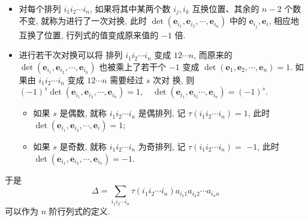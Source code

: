 \documentclass[10pt,punct]{ctexbeamer}
\begin{document}
    \begin{frame}

\begin{itemize}
        \item
      对每个排列 $i_1 i_2 \cdots i_n$, 如果将其中某两个数 $i_j, i_k$ 互换位置、其余的 $n-2$ 个数不变, 就称为进行了一次\alert{对换}, 此时 $\operatorname{det}\left(\boldsymbol{e}_{i_1}, \boldsymbol{e}_{i_2}, \cdots, \boldsymbol{e}_{i_n}\right)$ 中的 $\boldsymbol{e}_{i_j}, \boldsymbol{e}_i$, 相应地互换了位置, 行列式的值变成原来值的 $-1$ 倍.

      \item
      进行若干次对换可以将
      排列 $i_1 i_2 \cdots i_n$ 变成 $12 \cdots n$,
      而原来的 $\operatorname{det}\left(\boldsymbol{e}_{i_1}, \boldsymbol{e}_{i_2}, \cdots, \boldsymbol{e}_{i_n}\right)$ 也被乘上了若干个 $-1$ 变成 $\operatorname{det}\left(\boldsymbol{e}_1, \boldsymbol{e}_2, \cdots, \boldsymbol{e}_n\right)=1$.
      如果由 $i_1 i_2 \cdots i_n$ 变成 $12 \cdots n$ 需要经过 $s$ 次{对 换}, 则
      $
      (-1)^s \operatorname{det}\left(\boldsymbol{e}_{i_1}, \boldsymbol{e}_{i_2}, \cdots, \boldsymbol{e}_{i_n}\right)=1, \quad \operatorname{det}\left(\boldsymbol{e}_{i_1}, \boldsymbol{e}_{i_2} \cdots, \boldsymbol{e}_{i_n}\right)=(-1)^s.
      $
        \begin{itemize}
            \item 如果 $s$ 是偶数, 就称 $i_1 i_2 \cdots i_n$ 是偶排列, 记 $\tau \left(  i_1 i_2 \cdots i_n \right) =1$, 此时 $\operatorname{det}\left(\boldsymbol{e}_{i_1},\boldsymbol{e}_{i_2}, \cdots, \boldsymbol{e}_i\right)=1$;
            \item 如果 $s$ 是奇数, 就称 $i_1 i_2 \cdots i_n$ 为奇排列, 记 $\tau \left( i_1 i_2 \cdots i_n \right)=$ $-1$, 此时 $\operatorname{det}\left(\boldsymbol{e}_{i_1}, \boldsymbol{e}_{i_2}, \cdots, \boldsymbol{e}_{i_n}\right)=-1$.
        \end{itemize}
\end{itemize}
        于是 $$\Delta=\sum_{ i_1 i_2 \cdots i_n}  \tau  \left( i_1 i_2 \cdots i_n \right) a_{i_1 1} a_{i_2 2} \cdots a_{i_n n}$$ 可以作为 $n$ 阶行列式的定义.
    \end{frame}
\end{document}
